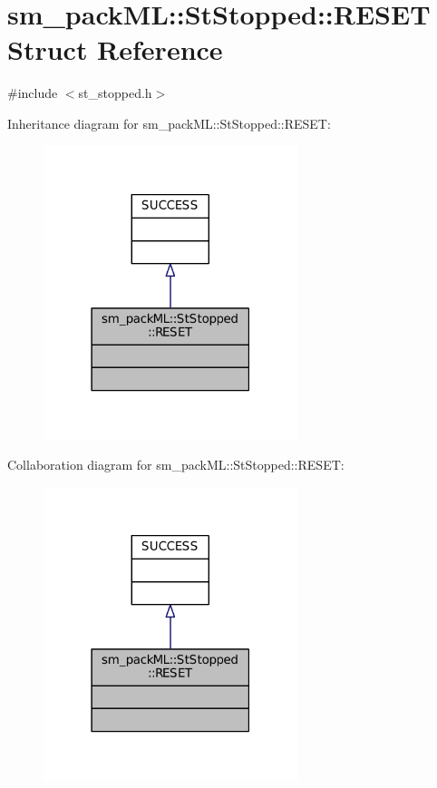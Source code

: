 \hypertarget{structsm__packML_1_1StStopped_1_1RESET}{}\section{sm\+\_\+pack\+ML\+:\+:St\+Stopped\+:\+:R\+E\+S\+ET Struct Reference}
\label{structsm__packML_1_1StStopped_1_1RESET}


{\ttfamily \#include $<$st\+\_\+stopped.\+h$>$}



Inheritance diagram for sm\+\_\+pack\+ML\+:\+:St\+Stopped\+:\+:R\+E\+S\+ET\+:
\nopagebreak
\begin{figure}[H]
\begin{center}
\leavevmode
\includegraphics[width=210pt]{structsm__packML_1_1StStopped_1_1RESET__inherit__graph}
\end{center}
\end{figure}


Collaboration diagram for sm\+\_\+pack\+ML\+:\+:St\+Stopped\+:\+:R\+E\+S\+ET\+:
\nopagebreak
\begin{figure}[H]
\begin{center}
\leavevmode
\includegraphics[width=210pt]{structsm__packML_1_1StStopped_1_1RESET__coll__graph}
\end{center}
\end{figure}


